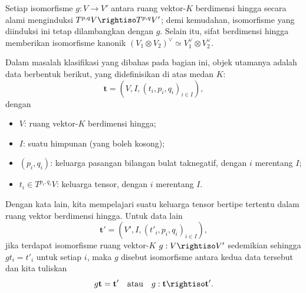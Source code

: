 Setiap isomorfisme $g:V\to V'$ antara ruang vektor-$K$ berdimensi hingga
secara alami menginduksi
$T^{p,q}V\rightiso T^{p,q}V'$; demi kemudahan, isomorfisme yang diinduksi ini
tetap dilambangkan dengan $g$. Selain itu, sifat berdimensi hingga memberikan
isomorfisme kanonik
$(V_1\otimes V_2)^\vee\simeq V_1^\vee\otimes V_2^\vee$.

Dalam masalah klasifikasi yang dibahas pada bagian ini, objek utamanya adalah
data berbentuk berikut, yang didefinisikan di atas medan $K$:
\begin{equation}\label{eqn:tensor-data}
	\mathbf{t}=(V,I,(t_i,p_i,q_i)_{i\in I}),
\end{equation}
dengan
\begin{itemize}
	\item $V$: ruang vektor-$K$ berdimensi hingga;
	\item $I$: suatu himpunan (yang boleh kosong);
	\item $(p_i,q_i)$: keluarga pasangan bilangan bulat taknegatif, dengan
	$i$ merentang $I$;
	\item $t_i\in T^{p_i,q_i}V$: keluarga tensor, dengan $i$ merentang $I$.
\end{itemize}

Dengan kata lain, kita mempelajari suatu keluarga tensor bertipe tertentu
dalam ruang vektor berdimensi hingga. Untuk data lain
\[
\mathbf{t}'=(V',I,(t'_i,p_i,q_i)_{i\in I}),
\]
jika terdapat isomorfisme ruang vektor-$K$ $g:V\rightiso V'$ sedemikian
sehingga $gt_i=t'_i$ untuk setiap $i$, maka $g$ disebut isomorfisme antara
kedua data tersebut dan kita tuliskan
\[
g\mathbf{t}=\mathbf{t}'\quad\text{atau}\quad
g:\mathbf{t}\rightiso\mathbf{t}'.
\]

